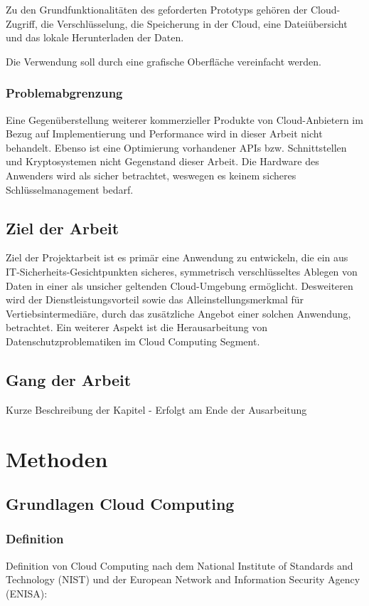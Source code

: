 \documentclass[12pt,a4paper,bibliography=totocnumbered,listof=totocnumbered]{scrartcl}
\begin{document}
Zu den Grundfunktionalitäten des geforderten Prototyps gehören der Cloud-Zugriff, die Verschlüsselung, die Speicherung in der Cloud, eine Dateiübersicht und das lokale Herunterladen der Daten.

Die Verwendung soll durch eine grafische Oberfläche vereinfacht werden.

\subsubsection{Problemabgrenzung}
Eine Gegenüberstellung weiterer kommerzieller Produkte von Cloud-Anbietern im Bezug auf Implementierung und Performance wird in dieser Arbeit nicht behandelt. Ebenso ist eine Optimierung vorhandener APIs bzw. Schnittstellen und Kryptosystemen nicht Gegenstand dieser Arbeit. Die Hardware des Anwenders wird als sicher betrachtet, weswegen es keinem sicheres Schlüsselmanagement bedarf.

\subsection{Ziel der Arbeit}
Ziel der Projektarbeit ist es primär eine Anwendung zu entwickeln, die ein aus IT-Sicherheits-Gesichtpunkten sicheres, symmetrisch verschlüsseltes Ablegen von Daten in einer als unsicher geltenden Cloud-Umgebung ermöglicht. Desweiteren wird der Dienstleistungsvorteil sowie das Alleinstellungsmerkmal für Vertiebsintermediäre, durch das zusätzliche Angebot einer solchen Anwendung, betrachtet. Ein weiterer Aspekt ist die Herausarbeitung von Datenschutzproblematiken im Cloud Computing Segment.

\subsection{Gang der Arbeit}
Kurze Beschreibung der Kapitel - Erfolgt am Ende der Ausarbeitung
\pagebreak

\section{Methoden}
\subsection{Grundlagen Cloud Computing}
\subsubsection{Definition}
Definition von Cloud Computing nach dem National Institute of Standards and Technology (NIST) und der European Network and Information Security Agency (ENISA):
\end{document}

